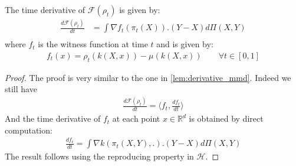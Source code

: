 \begin{lemma}\label{lem:time_derivative}
The time derivative of $\mathcal{F}(\rho_t)$ is given by:
	\begin{align*}
		\frac{d \mathcal{F}(\rho_t)}{dt}&=\int \nabla f_t(\pi_t(X)).(Y-X)d\Pi(X,Y)\\
	\end{align*}
	where $f_t$ is the witness function at time $t$ and is given by:
	\begin{align}
	f_t(x)=\rho_t(k(X,x))-\mu(k(X,x)) \qquad \forall t\in [0,1]
	\end{align}	
\end{lemma}
\begin{proof}
	The proof is very similar to the one in \cref{lem:derivative_mmd}. Indeed we still have
	\begin{align*}
		\frac{d \mathcal{F}(\rho_t)}{dt} = \langle f_t , \frac{df_t}{dt} \rangle
	\end{align*}
	And the time derivative of $f_t$ at each point $x\in\mathbb{R}^d$ is obtained by direct computation:
	\begin{align*}
		 \frac{df_t}{dt}= \int \nabla k(\pi_t(X,Y),.).(Y-X)d\Pi(X,Y)
	\end{align*}
	The result follows using the reproducing property in $\mathcal{H}$.
 \end{proof}










 
